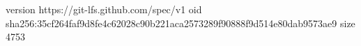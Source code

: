 version https://git-lfs.github.com/spec/v1
oid sha256:35cf264faf9d8fe4c62028c90b221aca2573289f90888f9d514e80dab9573ae9
size 4753

